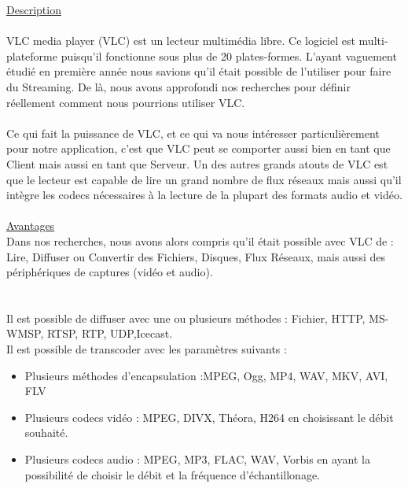 \documentclass{report}
\begin{document}
        
    \underline{Description}
    \\
    
    \\
    VLC media player (VLC) est un lecteur multimédia libre. Ce logiciel est multi-plateforme puisqu’il fonctionne sous plus de 20 plates-formes. L’ayant vaguement étudié en première année nous savions qu’il était possible de l’utiliser pour faire du Streaming. De là, nous avons approfondi nos recherches pour définir réellement comment nous pourrions utiliser VLC.
    \\
    \\
    Ce qui fait la puissance de VLC, et ce qui va nous intéresser particulièrement pour notre application, c’est que VLC peut se comporter aussi bien en tant que Client mais aussi en tant que Serveur. Un des autres grands atouts de VLC est que le lecteur est capable de lire un grand nombre de flux réseaux mais aussi qu’il intègre les codecs nécessaires à la lecture de la plupart des formats audio et vidéo.
    \\
   
    \\
    \underline{Avantages}\\
    
    Dans nos recherches, nous avons alors compris qu’il était possible avec VLC de : Lire, Diffuser ou Convertir des Fichiers, Disques, Flux Réseaux, mais aussi des périphériques de captures (vidéo et audio).
    \\
    \\
    \\
    Il est possible de diffuser avec une ou plusieurs méthodes : Fichier, HTTP, MS-WMSP, RTSP, RTP, UDP,Icecast.
    \\

    Il est possible de transcoder avec les paramètres suivants :
    \\

   \begin{itemize}
    \item Plusieurs méthodes d’encapsulation :MPEG, Ogg, MP4, WAV, MKV, AVI, FLV
    \item Plusieurs codecs vidéo : MPEG, DIVX, Théora, H264 en choisissant le débit souhaité.
    \item Plusieurs codecs audio : MPEG, MP3, FLAC, WAV, Vorbis en ayant la possibilité de choisir le débit et la fréquence d’échantillonage.
    \end{itemize} 
    \\
    \hfill{\\}
\end{document}
